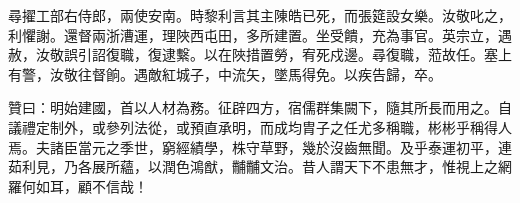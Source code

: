 \begin{pinyinscope}
尋擢工部右侍郎，兩使安南。時黎利言其主陳皓已死，而張筵設女樂。汝敬叱之，利懼謝。還督兩浙漕運，理陜西屯田，多所建置。坐受饋，充為事官。英宗立，遇赦，汝敬誤引詔復職，復逮繫。以在陜措置勞，宥死戍邊。尋復職，蒞故任。塞上有警，汝敬往督餉。遇敵紅城子，中流矢，墜馬得免。以疾告歸，卒。

贊曰：明始建國，首以人材為務。征辟四方，宿儒群集闕下，隨其所長而用之。自議禮定制外，或參列法從，或預直承明，而成均胄子之任尤多稱職，彬彬乎稱得人焉。夫諸臣當元之季世，窮經績學，株守草野，幾於沒齒無聞。及乎泰運初平，連茹利見，乃各展所蘊，以潤色鴻猷，黼黼文治。昔人謂天下不患無才，惟視上之網羅何如耳，顧不信哉！


\end{pinyinscope}